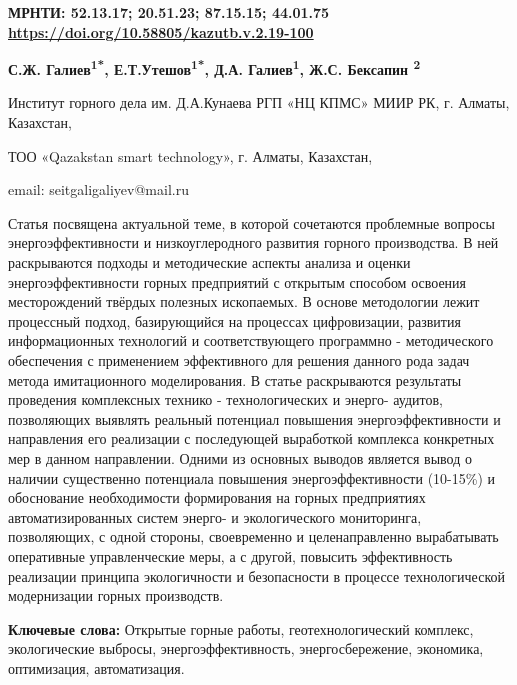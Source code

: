 \clearpage
{\bfseries МРНТИ: 52.13.17; 20.51.23; 87.15.15; 44.01.75}\hfill
\hfill {\bfseries \href{https://doi.org/10.58805/kazutb.v.2.19-100}{https://doi.org/10.58805/kazutb.v.2.19-100}}


\begin{center}
{\bfseries С.Ж. Галиев\textsuperscript{1*}, Е.Т.Утешов\textsuperscript{1*},
Д.А. Галиев\textsuperscript{1}, Ж.С. Бексапин \textsuperscript{2}}

Институт горного дела им. Д.А.Кунаева РГП «НЦ КПМС» МИИР РК, г. Алматы,
Казахстан,

ТОО «Qazakstan smart technology», г. Алматы, Казахстан,

email: seitgaligaliyev@mail.ru
\end{center}

\hspace{1.5em} Статья посвящена актуальной теме, в которой сочетаются проблемные
вопросы энергоэффективности и низкоуглеродного развития горного
производства. В ней раскрываются подходы и методические аспекты анализа
и оценки энергоэффективности горных предприятий с открытым способом
освоения месторождений твёрдых полезных ископаемых. В основе методологии
лежит процессный подход, базирующийся на процессах цифровизации,
развития информационных технологий и соответствующего
программно - методического обеспечения с применением эффективного для
решения данного рода задач метода имитационного моделирования. В статье
раскрываются результаты проведения комплексных технико - технологических и
энерго- аудитов, позволяющих выявлять реальный потенциал повышения
энергоэффективности и направления его реализации с последующей
выработкой комплекса конкретных мер в данном направлении. Одними из
основных выводов является вывод о наличии существенно потенциала
повышения энергоэффективности (10-15\%) и обоснование необходимости
формирования на горных предприятиях автоматизированных систем энерго- и
экологического мониторинга, позволяющих, с одной стороны, своевременно и
целенаправленно вырабатывать оперативные управленческие меры, а с
другой, повысить эффективность реализации принципа экологичности и
безопасности в процессе технологической модернизации горных производств.

\hspace{1.5em} {\bfseries Ключевые слова:} Открытые горные работы, геотехнологический
комплекс, экологические выбросы, энергоэффективность, энергосбережение, экономика,
оптимизация, автоматизация.

